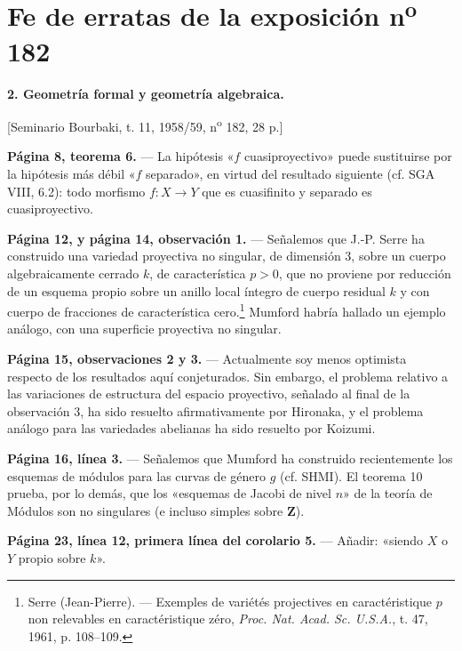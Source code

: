 \clearpage
\chapter*{Fe de erratas de la exposición n\textsuperscript{o} 182}
\setcounter{footnote}{1}

\noindent\textbf{2. Geometría formal y geometría algebraica.}

\begin{center}
[Seminario Bourbaki, t. 11, 1958/59, n\textsuperscript{o} 182, 28 p.]
\end{center}

\noindent\textbf{Página 8, teorema 6.} --- La hipótesis «$f$
cuasiproyectivo» puede sustituirse por la hipótesis más débil «$f$
separado», en virtud del resultado siguiente (cf. SGA VIII, 6.2): todo morfismo
$f:X\longrightarrow Y$ que es cuasifinito y separado es cuasiproyectivo.

\noindent\textbf{Página 12, y página 14, observación 1.} --- Señalemos que J.-P.
Serre ha construido una variedad proyectiva no singular, de dimensión 3, sobre
un cuerpo algebraicamente cerrado $k$, de característica $p>0$, que no proviene
por reducción de un esquema propio sobre un anillo local íntegro de cuerpo
residual $k$ y con cuerpo de fracciones de característica
cero.\footnote{Serre (Jean-Pierre). --- Exemples de variétés projectives en
caractéristique $p$ non relevables en caractéristique zéro, \emph{Proc. Nat.
Acad. Sc. U.S.A.}, t. 47, 1961, p. 108--109.} Mumford habría hallado un ejemplo
análogo, con una superficie proyectiva no singular.

\noindent\textbf{Página 15, observaciones 2 y 3.} --- Actualmente soy menos
optimista respecto de los resultados aquí conjeturados. Sin embargo, el
problema relativo a las variaciones de estructura del espacio proyectivo,
señalado al final de la observación 3, ha sido resuelto afirmativamente por
Hironaka, y el problema análogo para las variedades abelianas ha sido resuelto
por Koizumi.

\noindent\textbf{Página 16, línea 3.} --- Señalemos que Mumford ha construido
recientemente los esquemas de módulos para las curvas de género $g$ (cf. SHMI).
El teorema 10 prueba, por lo demás, que los «esquemas de Jacobi de nivel $n$»
de la teoría de Módulos son no singulares (e incluso simples sobre $\mathbf Z$).

\noindent\textbf{Página 23, línea 12, primera línea del corolario
5.} --- Añadir: «siendo $X$ o $Y$ propio sobre $k$».

